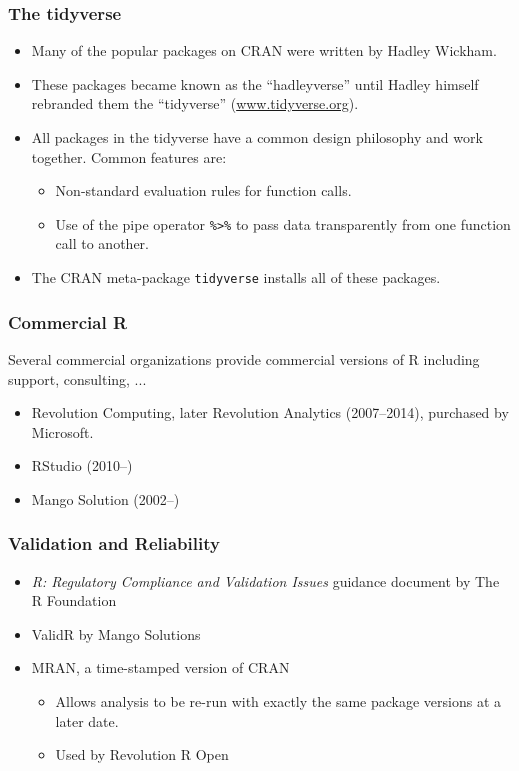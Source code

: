 \documentclass[svgnames]{beamer}
\begin{document}
\begin{frame}[fragile]
  \frametitle{The tidyverse}
  
  \begin{itemize}
  \item Many of the popular packages on CRAN were written by Hadley Wickham.
  \item These packages became known as the ``hadleyverse'' until Hadley
    himself rebranded them the ``tidyverse'' (\url{www.tidyverse.org}).
  \item All packages in the tidyverse have a common design philosophy
    and work together. Common features are:
    \begin{itemize}
    \item Non-standard evaluation rules for function calls.
    \item Use of the pipe operator \verb+%>%+ to pass data
      transparently from one function call to another.
    \end{itemize}
  \item The CRAN meta-package \texttt{tidyverse} installs all of these
    packages.
  \end{itemize}
  
\end{frame}

\begin{frame}
  \frametitle{Commercial R}

  Several commercial organizations provide commercial versions of R
  including support, consulting, ...
  \begin{itemize}
  \item Revolution Computing, later Revolution Analytics (2007--2014),
    purchased by Microsoft.
  \item RStudio (2010--)
  \item Mango Solution (2002--)
  \end{itemize}

\end{frame}

\begin{frame}
  \frametitle{Validation and Reliability}
  \begin{itemize}
  \item {\em R: Regulatory Compliance and Validation Issues} guidance
    document by The R Foundation
  \item ValidR by Mango Solutions
  \item MRAN, a time-stamped version of CRAN
    \begin{itemize}
    \item Allows analysis to be re-run with exactly the same package
      versions at a later date.
    \item Used by Revolution R Open
    \end{itemize}
  \end{itemize}
\end{frame}
\end{document}
